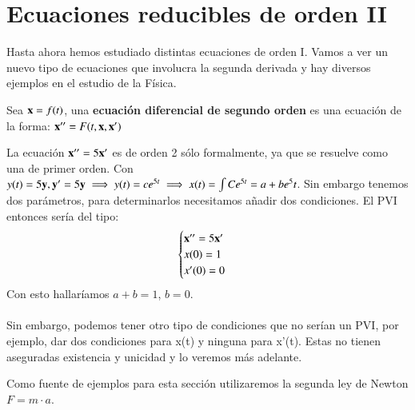 
\section{Ecuaciones reducibles de orden II}
Hasta ahora hemos estudiado distintas ecuaciones de orden I. Vamos a ver un nuevo tipo de ecuaciones que involucra la segunda derivada y hay diversos ejemplos en el estudio de la Física.

\begin{dfn}
    Sea $\mathbf{x} = f(t)$, una \textbf{ecuación diferencial de segundo orden} es una ecuación de la forma: $\mathbf{x}'' = F(t, \mathbf{x}, \mathbf{x}')$
\end{dfn}

\begin{obs}
    La ecuación $\mathbf{x}'' = 5\mathbf{x}'$ es de orden 2 sólo formalmente, ya que se resuelve como una de primer orden. Con $y(t) = 5\mathbf{y}, \mathbf{y}' = 5\mathbf{y} \implies y(t) = ce^{5t} \implies x(t) = \int C e^{5t} = a + b e^5t$. Sin embargo tenemos dos parámetros, para determinarlos necesitamos añadir dos condiciones. El PVI entonces sería del tipo:
    $$
        \begin{cases}
            \mathbf{x}'' = 5\mathbf{x}'\\
            x(0) = 1\\
            x'(0) = 0
        \end{cases}
    $$
    Con esto hallaríamos $a+b = 1$, $b=0$.\\\\
    Sin embargo, podemos tener otro tipo de condiciones que no serían un PVI, por ejemplo, dar dos condiciones para x(t) y ninguna para x'(t). Estas no tienen aseguradas existencia y unicidad y lo veremos más adelante.
\end{obs}

Como fuente de ejemplos para esta sección utilizaremos la segunda ley de Newton $F = m\cdot a$.

